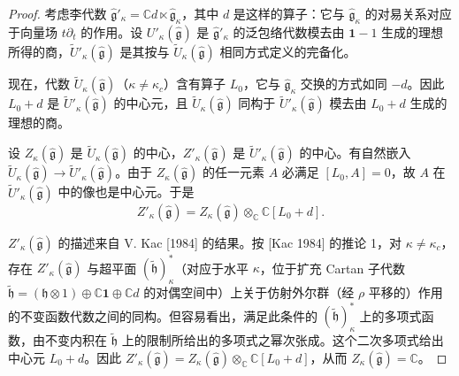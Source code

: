 \begin{proof}
考虑李代数 $\hat{\mathfrak{g}}'_\kappa=\mathbb{C}d\ltimes\hat{\mathfrak{g}}_\kappa$，其中 $d$ 是这样的算子：它与 $\hat{\mathfrak{g}}_\kappa$ 的对易关系对应于向量场 $t\partial_t$ 的作用。设 $U'_\kappa(\hat{\mathfrak{g}})$ 是 $\hat{\mathfrak{g}}'_\kappa$ 的泛包络代数模去由 $\mathbf{1}-1$ 生成的理想所得的商，$\widetilde{U}'_\kappa(\hat{\mathfrak{g}})$ 是其按与 $\widetilde{U}_\kappa(\hat{\mathfrak{g}})$ 相同方式定义的完备化。

现在，代数 $\widetilde{U}_\kappa(\hat{\mathfrak{g}})$（$\kappa\ne\kappa_c$）含有算子 $L_0$，它与 $\hat{\mathfrak{g}}_\kappa$ 交换的方式如同 $-d$。因此 $L_0+d$ 是 $\widetilde{U}'_\kappa(\hat{\mathfrak{g}})$ 的中心元，且 $\widetilde{U}_\kappa(\hat{\mathfrak{g}})$ 同构于 $\widetilde{U}'_\kappa(\hat{\mathfrak{g}})$ 模去由 $L_0+d$ 生成的理想的商。

设 $Z_\kappa(\hat{\mathfrak{g}})$ 是 $\widetilde{U}_\kappa(\hat{\mathfrak{g}})$ 的中心，$Z'_\kappa(\hat{\mathfrak{g}})$ 是 $\widetilde{U}'_\kappa(\hat{\mathfrak{g}})$ 的中心。有自然嵌入 $\widetilde{U}_\kappa(\hat{\mathfrak{g}})\to\widetilde{U}'_\kappa(\hat{\mathfrak{g}})$。由于 $Z_\kappa(\hat{\mathfrak{g}})$ 的任一元素 $A$ 必满足 $[L_0,A]=0$，故 $A$ 在 $\widetilde{U}'_\kappa(\hat{\mathfrak{g}})$ 中的像也是中心元。于是
\[
    Z'_\kappa(\hat{\mathfrak{g}})=Z_\kappa(\hat{\mathfrak{g}})\otimes_{\mathbb{C}}\mathbb{C}[L_0+d].
\]

$Z'_\kappa(\hat{\mathfrak{g}})$ 的描述来自 V. Kac [1984] 的结果。按 [Kac 1984] 的推论 1，对 $\kappa\ne\kappa_c$，存在 $Z'_\kappa(\hat{\mathfrak{g}})$ 与超平面 $(\tilde{\mathfrak{h}})^*_\kappa$（对应于水平 $\kappa$，位于扩充 Cartan 子代数 $\tilde{\mathfrak{h}}=(\mathfrak{h}\otimes1)\oplus\mathbb{C}\mathbf{1}\oplus\mathbb{C}d$ 的对偶空间中）上关于仿射外尔群（经 $\rho$ 平移的）作用的不变函数代数之间的同构。但容易看出，满足此条件的 $(\tilde{\mathfrak{h}})^*_\kappa$ 上的多项式函数，由不变内积在 $\tilde{\mathfrak{h}}$ 上的限制所给出的多项式之幂次张成。这个二次多项式给出中心元 $L_0+d$。因此 $Z'_\kappa(\hat{\mathfrak{g}})=Z_\kappa(\hat{\mathfrak{g}})\otimes_{\mathbb{C}}\mathbb{C}[L_0+d]$，从而 $Z_\kappa(\hat{\mathfrak{g}})=\mathbb{C}$。
\end{proof}

